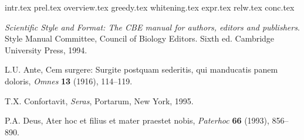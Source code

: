 \documentclass{IOS-Book-Article}
\begin{document}
 {intr.tex}
 {prel.tex}
 {overview.tex}
 {greedy.tex}
 {whitening.tex}
 {expr.tex}
 {relw.tex}
 {conc.tex}



\newpage



\begin{thebibliography}{99}

\textit{Scientific Style and Format: The CBE manual for authors,
editors and publishers}. Style Manual Committee, Council of Biology Editors.
Sixth ed. Cambridge University Press, 1994.

L.U. Ante, Cem surgere: Surgite postquam sederitis, qui manducatis panem doloris,
\textit{Omnes} \textbf{13} (1916), 114--119.

T.X. Confortavit, \textit{Seras}, Portarum, New York, 1995.

P.A. Deus, Ater hoc et filius et mater praestet nobis,
\textit{Paterhoc} \textbf{66} (1993), 856--890.

\end{thebibliography}
\end{document}
